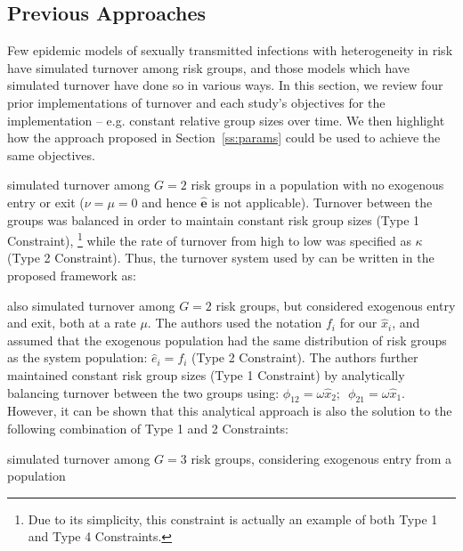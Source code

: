 \subsection{Previous Approaches}
\label{ss:prev-approach}
Few epidemic models of sexually transmitted infections
with heterogeneity in risk
have simulated turnover among risk groups,
and those models which have simulated turnover
have done so in various ways.
In this section, we review
four prior implementations of turnover and each study's objectives for the implementation
-- e.g. constant relative group sizes over time.
We then highlight how the approach proposed in Section~\ref{ss:params}
could be used to achieve the same objectives.
\par
\citet{Stigum1994} simulated turnover among $G = 2$ risk groups
in a population with no exogenous entry or exit
($\nu = \mu = 0$ and hence $\bm{\hat{e}}$ is not applicable).
Turnover between the groups was balanced
in order to maintain constant risk group sizes (Type 1 Constraint),%
\footnote{Due to its simplicity,
  this constraint is actually an example of both Type 1 and Type 4 Constraints.}
while the rate of turnover from high to low
was specified as $\kappa$ (Type 2 Constraint).
Thus, the turnover system used by \citet{Stigum1994} can be written
in the proposed framework as:

\par
\citet{Henry2015} also simulated turnover among $G = 2$ risk groups,
but considered exogenous entry and exit, both at a rate $\mu$.
The authors used the notation $f_i$ for our $\hat{x}_i$, and assumed that
the exogenous population had the same distribution of risk groups
as the system population: $\hat{e}_i = f_i$ (Type 2 Constraint).
The authors further maintained constant risk group sizes (Type 1 Constraint)
by analytically balancing turnover between the two groups using:
$\phi_{12} = \omega \hat{x}_2 ;\enspace \phi_{21} = \omega \hat{x}_1$.
However, it can be shown that this analytical approach
is also the solution to the following combination of Type 1 and 2 Constraints:

\par
\citet{Eaton2014} simulated turnover among $G = 3$ risk groups,
considering exogenous entry from a population
